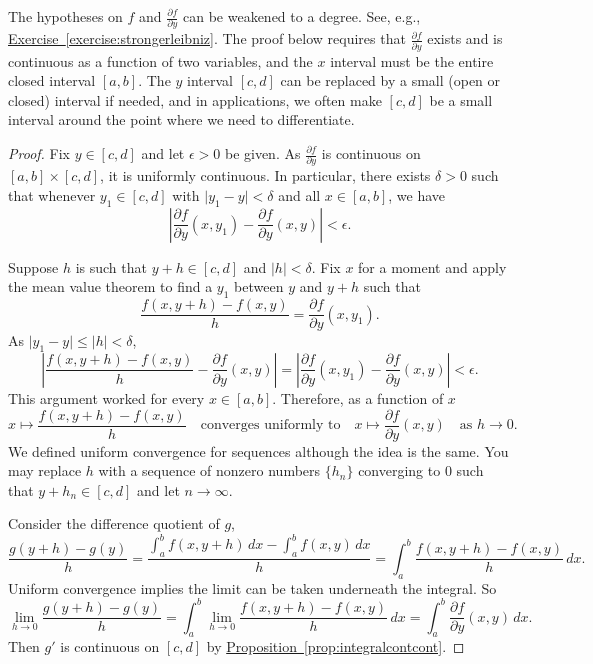 \documentclass[12pt,openany]{book}
\newcommand{\sabs}[1]{\lvert {#1} \rvert}
\newcommand{\abs}[1]{\left\lvert {#1} \right\rvert}
\theoremstyle{plain}
\theoremstyle{remark}
\theoremstyle{definition}
\theoremstyle{exercise}
\theoremstyle{example}
\newcommand{\exerciseref}[1]{\hyperref[#1]{Exercise~\ref*{#1}}}
\newcommand{\propref}[1]{\hyperref[#1]{Proposition~\ref*{#1}}}
\begin{document}
The hypotheses on $f$ and $\frac{\partial f}{\partial y}$ can be
weakened to a degree. See, e.g., \exerciseref{exercise:strongerleibniz}.
The proof below requires that
$\frac{\partial f}{\partial y}$ exists and is continuous
as a function of two variables, and the $x$ interval must be the entire
closed interval $[a,b]$.
The $y$ interval
$[c,d]$ can be replaced by a small (open or closed) interval if
needed, and in applications, we often make $[c,d]$ be a
small interval around the point where we need to differentiate.

\begin{proof}
Fix $y \in [c,d]$ and let $\epsilon > 0$ be given.
As $\frac{\partial f}{\partial y}$ is continuous on $[a,b] \times [c,d]$, it
is uniformly continuous.  In particular, there exists $\delta > 0$ such that
whenever $y_1 \in [c,d]$ with
$\sabs{y_1-y} < \delta$ and all $x \in [a,b]$, we have
\begin{equation*}
\abs{\frac{\partial f}{\partial y}(x,y_1)-\frac{\partial f}{\partial y}(x,y)} < \epsilon .
\end{equation*}

Suppose $h$ is such that $y+h \in [c,d]$ and $\sabs{h} < \delta$.
Fix $x$ for a moment
and apply the mean value theorem to find a $y_1$ between $y$ and $y+h$ such that
\begin{equation*}
\frac{f(x,y+h)-f(x,y)}{h}
=
\frac{\partial f}{\partial y}(x,y_1) .
\end{equation*}
As $\sabs{y_1-y} \leq \sabs{h} < \delta$,
\begin{equation*}
\abs{
\frac{f(x,y+h)-f(x,y)}{h}
-
\frac{\partial f}{\partial y}(x,y) 
}
=
\abs{
\frac{\partial f}{\partial y}(x,y_1) 
-
\frac{\partial f}{\partial y}(x,y) 
}
< \epsilon .
\end{equation*}
This argument worked for every $x \in [a,b]$.  Therefore, as a function of
$x$
\begin{equation*}
x \mapsto \frac{f(x,y+h)-f(x,y)}{h}
\quad
\text{converges uniformly to}
\quad
x \mapsto \frac{\partial f}{\partial y}(x,y)
\quad
\text{as } h \to 0 .
\end{equation*}
We defined uniform convergence for sequences although the idea is the
same.  You may replace $h$ with a sequence of nonzero 
numbers $\{ h_n \}$
converging to $0$ such that $y+h_n \in [c,d]$ and let $n \to \infty$.

Consider the difference quotient of $g$,
\begin{equation*}
\frac{g(y+h)-g(y)}{h}
=
\frac{\int_a^b f(x,y+h) \,dx -
\int_a^b f(x,y) \,dx }{h}
=
\int_a^b \frac{f(x,y+h)-f(x,y)}{h} \,dx .
\end{equation*}
Uniform convergence implies the limit can be taken underneath the integral.
So
\begin{equation*}
\lim_{h\to 0}
\frac{g(y+h)-g(y)}{h}
= 
\int_a^b 
\lim_{h\to 0}
\frac{f(x,y+h)-f(x,y)}{h} \,dx 
=
\int_a^b 
\frac{\partial f}{\partial y}(x,y) \,dx .
\end{equation*}
Then $g'$ is continuous on $[c,d]$ by
\propref{prop:integralcontcont}.
\end{proof}
\end{document}
